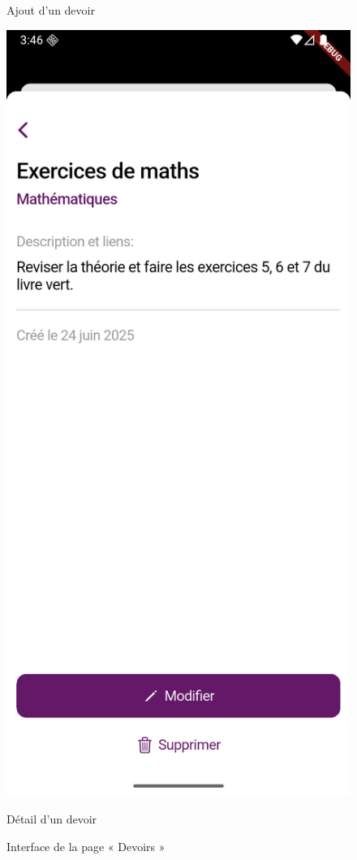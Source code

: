 \documentclass[12pt]{report}
\begin{document}
\begin{itemize}
\begin{figure}[H]
\begin{minipage}[t]{0.32\textwidth}
			\caption*{Ajout d’un devoir}
		\end{minipage}
		\hfill
		\begin{minipage}[t]{0.32\textwidth}
			\centering
			\includegraphics[width=\textwidth]{img/view_homework.png}
			\caption*{Détail d’un devoir}
		\end{minipage}
		\caption{Interface de la page « Devoirs »}
	\end{figure}
	
\end{itemize}
\end{document}
